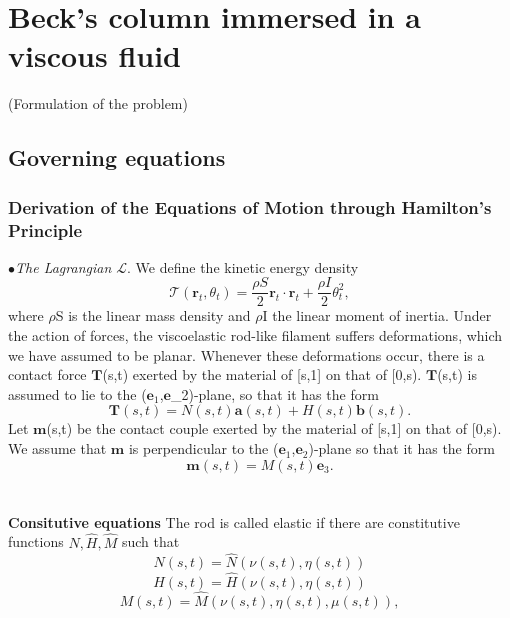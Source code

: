 \documentclass[12pt]{article}
\begin{document}
\section{Beck’s column immersed in a viscous fluid}
(Formulation of the problem)
\subsection{Governing equations}\label{Governing equations}
\subsubsection{Derivation of the Equations of Motion through  Hamilton's Principle}
$\bullet$\emph{The Lagrangian $\mathcal{L}$}. We define the kinetic energy density 
\[ \mathcal{T}(\mathbf{r}_t, \theta_t) = \frac{\rho S}{2} \mathbf{r}_t \cdot \mathbf{r}_t + \frac{\rho I}{2}\theta_t ^2,
\]
where $\rho$S is the linear mass density and $\rho$I the linear moment of inertia.
Under the action of forces, the viscoelastic rod-like filament suffers deformations, which we have assumed to be planar. Whenever these deformations occur, there is a contact force
$\mathbf{T}$(s,t) exerted by the material of [s,1] on that of [0,s). $\mathbf{T}$(s,t) is assumed to lie to the ($\mathbf{e}_1$,$\mathbf{e}$_2)-plane, so that it has the form
\[  \mathbf{T}(s,t)= N(s,t) \mathbf{a}(s,t) + H(s,t)\mathbf{b} (s,t).
\]
Let $\mathbf{m}$(s,t) be the contact couple exerted by the material of [s,1] on that of [0,s). We assume that $\mathbf{m}$ is perpendicular to the ($\mathbf{e}_1$,$\mathbf{e}_2$)-plane so that it has the form
\[ 
\mathbf{m}(s,t) = M(s,t)\mathbf{e}_3.
\]
\\\\
\textbf{Consitutive equations} 
The rod is called elastic if there are constitutive functions $\hat{N}, \hat{H}, \hat{M}$ such that
\[  N (s,t)=  \hat{N}(\nu (s,t),\eta (s,t))
\]
\[  H (s,t)=  \hat{H}(\nu (s,t),\eta (s,t)) 
\]
\[  M (s,t)=  \hat{M}(\nu (s,t),\eta (s,t), \mu(s,t)),
\]
\end{document}
